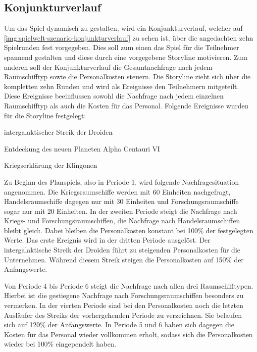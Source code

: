 \subsection{Konjunkturverlauf}
\label{sec:spielwelt-szenario-konjunkturverlauf}


Um das Spiel dynamisch zu gestalten, wird ein Konjunkturverlauf, welcher auf \vref{img:spielwelt-szenario-konjunkturverlauf} zu sehen ist, über die angedachten zehn Spielrunden fest vorgegeben. Dies soll zum einen das Spiel für die Teilnehmer spannend gestalten und diese durch eine vorgegebene Storyline motivieren. Zum anderen soll der Konjunkturverlauf die Gesamtnachfrage nach jedem Raumschifftyp sowie die Personalkosten steuern. Die Storyline zieht sich über die kompletten zehn Runden und wird als Ereignisse den Teilnehmern mitgeteilt. Diese Ereignisse beeinflussen sowohl die Nachfrage nach jedem einzelnen Raumschifftyp als auch die Kosten für das Personal. Folgende Ereignisse wurden für die Storyline festgelegt:

\begin{seList}
\item intergalaktischer Streik der Droiden
\item Entdeckung des neuen Planeten Alpha Centauri VI
\item Kriegserklärung der Klingonen
\end{seList}

Zu Beginn des Planspiels, also in Periode 1, wird folgende Nachfragesituation angenommen. Die Kriegsraumschiffe werden mit 60 Einheiten nachgefragt, Handelsraumschiffe dagegen nur mit 30 Einheiten und Forschungsraumschiffe sogar nur mit 20 Einheiten. In der zweiten Periode steigt die Nachfrage nach Kriegs- und Forschungsraumschiffen, die Nachfrage nach Handelsraumschiffen bleibt gleich. Dabei bleiben die Personalkosten konstant bei 100\% der festgelegten Werte. Das erste Ereignis wird in der dritten Periode ausgelöst. Der intergalaktische Streik der Droiden führt zu steigenden Personalkosten für die Unternehmen. Während diesem Streik steigen die Personalkosten auf 150\% der Anfangswerte.
 
Von Periode 4 bis Periode 6 steigt die Nachfrage nach allen drei Raumschifftypen. Hierbei ist die gestiegene Nachfrage nach Forschungsraumschiffen besonders zu vermerken. In der vierten Periode sind bei den Personalkosten noch die letzten Ausläufer des Streiks der vorhergehenden Periode zu verzeichnen. Sie belaufen sich auf 120\% der Anfangswerte. In Periode 5 und 6 haben sich dagegen die Kosten für das Personal wieder vollkommen erholt, sodass sich die Personalkosten wieder bei 100\% eingependelt haben.

